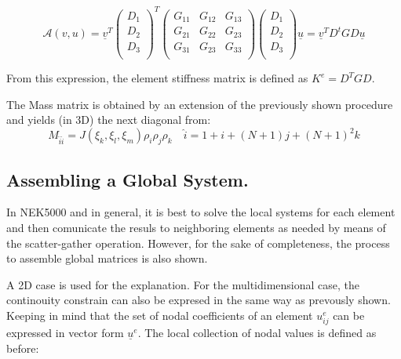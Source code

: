 \documentclass[
  a4paper,
  10pt]{article}
\begin{document}
\begin{equation}
    \mathcal{A}(v,u)= \underline{v}^{T}
    \begin{pmatrix}
    D_1 \\
    D_2 \\
    D_3 \\
    \end{pmatrix}^{T} 
    \begin{pmatrix}
    G_{11} & G_{12} & G_{13}\\
    G_{21} & G_{22} & G_{23}\\
    G_{31} & G_{23} & G_{33}\\
    \end{pmatrix} 
    \begin{pmatrix}
    D_1 \\
    D_2 \\
    D_3 \\
    \end{pmatrix} \underline{u}=\underline{v}^{T}D^{t}GD\underline{u}
\end{equation}

From this expression, the element stiffness matrix is defined as
\(K^{e}=D^{T}GD\).

The Mass matrix is obtained by an extension of the previously shown
procedure and yields (in 3D) the next diagonal from: \begin{equation}
    M_{\hat{i}\hat{i}}= J(\xi_k,\xi_l,\xi_m)\rho_i\rho_j\rho_k \quad \hat{i}=1+i+(N+1)j+(N+1)^{2}k
\end{equation}

\hypertarget{assembling-a-global-system.}{%
\subsection{Assembling a Global
System.}\label{assembling-a-global-system.}}

In NEK5000 and in general, it is best to solve the local systems for
each element and then comunicate the resuls to neighboring elements as
needed by means of the scatter-gather operation. However, for the sake
of completeness, the process to assemble global matrices is also shown.

A 2D case is used for the explanation. For the multidimensional case,
the continouity constrain can also be expresed in the same way as
prevously shown. Keeping in mind that the set of nodal coefficients of
an element \(u^{e}_{ij}\) can be expressed in vector form
\(\underline{u}^{e}\). The local collection of nodal values is defined
as before:
\end{document}
